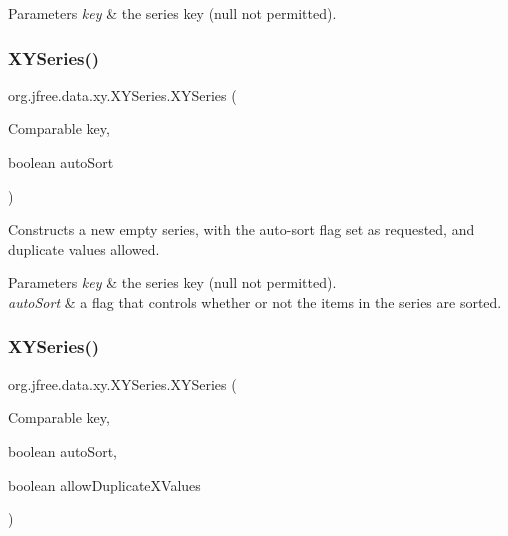 \begin{DoxyParams}{Parameters}
{\em key} & the series key ({\ttfamily null} not permitted). \\
\hline
\end{DoxyParams}
\mbox{\label{classorg_1_1jfree_1_1data_1_1xy_1_1_x_y_series_a45edbd9d252fb211373316df9cacac44}} 
\subsubsection{\texorpdfstring{X\+Y\+Series()}{XYSeries()}\hspace{0.1cm}{\footnotesize\ttfamily [2/3]}}
{\footnotesize\ttfamily org.\+jfree.\+data.\+xy.\+X\+Y\+Series.\+X\+Y\+Series (\begin{DoxyParamCaption}\item[{Comparable}]{key,  }\item[{boolean}]{auto\+Sort }\end{DoxyParamCaption})}

Constructs a new empty series, with the auto-\/sort flag set as requested, and duplicate values allowed.


\begin{DoxyParams}{Parameters}
{\em key} & the series key ({\ttfamily null} not permitted). \\
\hline
{\em auto\+Sort} & a flag that controls whether or not the items in the series are sorted. \\
\hline
\end{DoxyParams}
\mbox{\label{classorg_1_1jfree_1_1data_1_1xy_1_1_x_y_series_ab7bfd6ca2dee007aeb5760e862e650d9}} 
\subsubsection{\texorpdfstring{X\+Y\+Series()}{XYSeries()}\hspace{0.1cm}{\footnotesize\ttfamily [3/3]}}
{\footnotesize\ttfamily org.\+jfree.\+data.\+xy.\+X\+Y\+Series.\+X\+Y\+Series (\begin{DoxyParamCaption}\item[{Comparable}]{key,  }\item[{boolean}]{auto\+Sort,  }\item[{boolean}]{allow\+Duplicate\+X\+Values }\end{DoxyParamCaption})}

